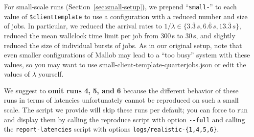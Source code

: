 \documentclass[runningheads]{article}
\numberwithin{dummy}{subsection}
\begin{document}
For small-scale runs (Section~\ref{sec:small-setup}), we prepend ``\texttt{small-}'' to each value of \texttt{\$clienttemplate} to use a configuration with a reduced number and size of jobs.
In particular, we reduced the arrival rates to $1/\lambda \in \{3.\overline{3}\,s, 6.\overline{6}\,s, 13.\overline{3}\,s\}$, reduced the mean wallclock time limit per job from 300\,s to 30\,s, and slightly reduced the size of individual bursts of jobs.
As in our original setup, note that even smaller configurations of Mallob may lead to a ``too busy'' system with these values, so you may want to use small-client-template-quarterjobs.json or edit the values of $\lambda$ yourself.

We suggest to \textbf{omit runs 4, 5, and 6} because the different behavior of these runs in terms of latencies unfortunately cannot be reproduced on such a small scale.
The script we provide will skip these runs per default; you can force to run and display them by calling the reproduce script with option \texttt{-{}-full} and calling the \texttt{report-latencies} script with options \texttt{logs/realistic-\{1,4,5,6\}}.
\end{document}
